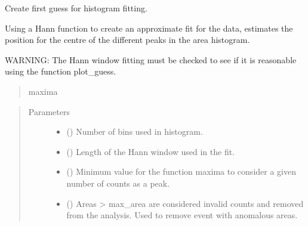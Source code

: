 \documentclass[letterpaper,10pt,english]{sphinxmanual}
\begin{document}

\begin{fulllineitems}
\label{\detokenize{tes:tes.calibration.guess_histogram}}
\sphinxAtStartPar
Create first guess for histogram fitting.

\sphinxAtStartPar
Using a Hann function to create an approximate fit for the
data, estimates the position for the centre of the different
peaks in the area histogram.

\sphinxAtStartPar
WARNING:
The Hann window fitting must be checked to see if
it is reasonable using the function plot\_guess.
\begin{quote}

\sphinxAtStartPar
maxima
\end{quote}
\begin{quote}\begin{description}
\item[{Parameters}] \leavevmode\begin{itemize}
\item {} 
\sphinxAtStartPar
{} () \textendash{} Number of bins used in histogram.

\item {} 
\sphinxAtStartPar
{} () \textendash{} Length of the Hann window used in the fit.

\item {} 
\sphinxAtStartPar
{} () \textendash{} Minimum value for the function maxima to consider
a given number of counts as a peak.

\item {} 
\sphinxAtStartPar
{} () \textendash{} Areas \textgreater{} max\_area are considered invalid counts and
removed from the analysis. Used to remove event with
anomalous areas.


\end{itemize}
\end{description}
\end{quote}
\end{fulllineitems}
\end{document}

